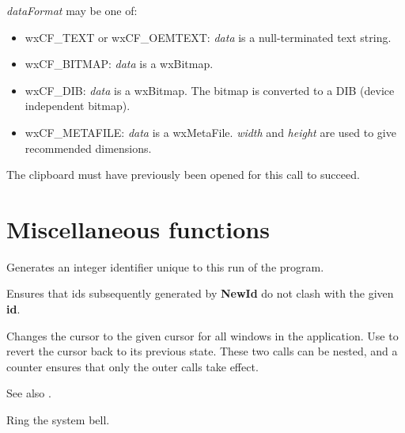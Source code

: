 {\it dataFormat} may be one of:

\begin{itemize}\itemsep=0pt
\item wxCF\_TEXT or wxCF\_OEMTEXT: {\it data} is a null-terminated text string.
\item wxCF\_BITMAP: {\it data} is a wxBitmap.
\item wxCF\_DIB: {\it data} is a wxBitmap. The bitmap is converted to a DIB (device independent bitmap).
\item wxCF\_METAFILE: {\it data} is a wxMetaFile. {\it width} and {\it height} are used to give recommended dimensions.
\end{itemize}

The clipboard must have previously been opened for this call to succeed.

\section{Miscellaneous functions}\label{miscellany}



Generates an integer identifier unique to this run of the program.



Ensures that ids subsequently generated by {\bf NewId} do not clash with
the given {\bf id}.

\label{wxbeginbusycursor}


Changes the cursor to the given cursor for all windows in the application.
Use  to revert the cursor back
to its previous state. These two calls can be nested, and a counter
ensures that only the outer calls take effect.

See also .



Ring the system bell.

\label{wxcleanup}


